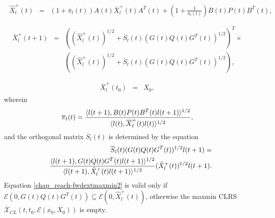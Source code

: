 \documentclass[letterpaper,10pt,english]{sphinxmanual}
\begin{document}
\label{chap_reach:equation-fwdextmaxmin1}\begin{gather}
\begin{split}\hat{X}^+_l(t) & = & (1+\overline{\pi}_l(t))A(t)\overline{X}^+_l(t)A^T(t) +
\left(1+\frac{1}{\overline{\pi}_l(t)}\right)
B(t)P(t)B^T(t),  \\\end{split}\label{chap_reach-fwdextmaxmin1}
\end{gather}\label{chap_reach:equation-fwdextmaxmin2}\begin{gather}
\begin{split}\overline{X}^+_l(t+1) & = & \left((\hat{X}^+_l(t))^{1/2} +
\overline{S}_l(t)(G(t)Q(t)G^T(t))^{1/2}\right)^T
\times \nonumber \\
& &\left((\hat{X}^+_l(t))^{1/2} + \overline{S}_l(t)(G(t)Q(t)G^T(t))^{1/2}\right),\\\end{split}\label{chap_reach-fwdextmaxmin2}
\end{gather}\label{chap_reach:equation-fwdextmaxmin3}\begin{gather}
\begin{split}\overline{X}^+_l(t_0) & = & X_0,\end{split}\label{chap_reach-fwdextmaxmin3}
\end{gather}
wherein
\begin{gather}
\begin{split}\overline{\pi}_l(t) = \frac{\langle l(t+1),
B(t)P(t)B^T(t)l(t+1)\rangle^{1/2}}{\langle l(t),
\overline{X}^+_l(t)l(t)\rangle^{1/2}},\end{split}\notag
\end{gather}
and the orthogonal matrix $\overline{S}_l(t)$ is determined by
the equation
\begin{gather}
\begin{split}\begin{aligned}
& & \overline{S}_l(t)(G(t)Q(t)G^T(t))^{1/2}l(t+1) = \\
& & \frac{\langle l(t+1),
G(t)Q(t)G^T(t)l(t+1)\rangle^{1/2}}{\langle l(t+1),
\hat{X}^+_l(t)l(t+1)\rangle^{1/2}}(\hat{X}^+_l(t))^{1/2}l(t+1).\end{aligned}\end{split}\notag
\end{gather}
Equation \eqref{chap_reach-fwdextmaxmin2} is valid only if
${\mathcal E}(0,G(t)Q(t)G^T(t))\subseteq{\mathcal E}(0,\hat{X}^+_l(t))$,
otherwise the maxmin CLRS
$\overline{{\mathcal X}}_{CL}(t,t_0,{\mathcal E}(x_0,X_0))$ is
empty.
\end{document}
